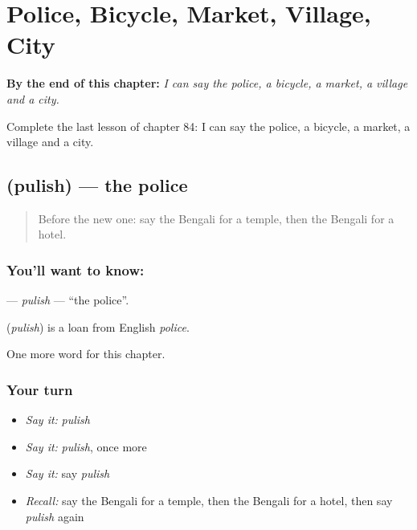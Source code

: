 
\chapter{Police, Bicycle, Market, Village, City}
\label{ch:bn-police-bicycle-market-village-city}

\begin{chapteropening}
\textbf{By the end of this chapter:} \emph{I can say the police, a bicycle, a market, a village and a city.}

Complete the last lesson of chapter 84: I can say the police, a bicycle, a market, a village and a city.
\end{chapteropening}

\section[\texorpdfstring{\bn{পুলিশ} (pulish)}{পুলিশ (pulish)}]{ (pulish) — the police}

\label{lesson:BN-C84-pulish}



\begin{quote}
Before the new one: say the Bengali for a temple, then the Bengali for a hotel.
\end{quote}

\subsection*{You'll want to know: }
\textbf{} — \emph{pulish} — \textquotedblleft{}the police\textquotedblright{}.

\begin{cousinweb}
\textbf{} (\emph{pulish}) is a loan from English \emph{police}.
\end{cousinweb}

\begin{grammarlens}[title={What you've built}]
One more word for this chapter.
\end{grammarlens}

\subsection*{Your turn}
\begin{itemize}
\raggedright
  \item \emph{Say it:} \emph{pulish}
  \item \emph{Say it:} \emph{pulish}, once more
  \item \emph{Say it:} say \emph{pulish}
  \item \emph{Recall:} say the Bengali for a temple, then the Bengali for a hotel, then say \emph{pulish} again
\end{itemize}

